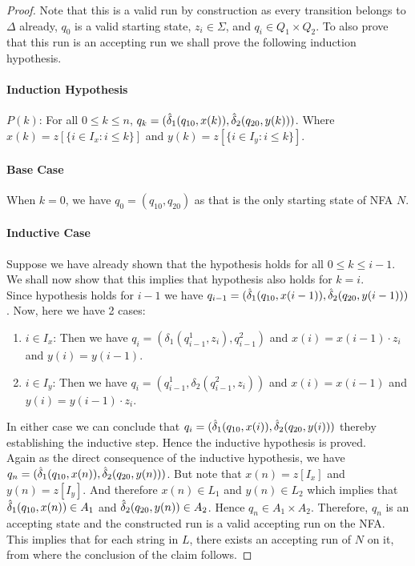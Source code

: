 \begin{soln}
\begin{proof}
Note that this is a valid run by construction as every transition belongs to $\Delta$ already, $q_0$ is a valid starting state, $z_i \in \Sigma$, and $q_i \in Q_1 \times Q_2$. To also prove that this run is an accepting run we shall prove the following induction hypothesis.

\paragraph{Induction Hypothesis}$P(k)$: For all $0 \leq k \leq n$, $q_k = (\hat{\delta}_1 (q_{10}, x(k)), \hat{\delta}_2(q_{20}, y(k)))$. Where $x(k) = z[\{i \in I_x : i \leq k\}]$ and $y(k) = z[\{i \in I_y : i \leq k\}]$.

\paragraph{Base Case} When $k=0$, we have $q_0 = (q_{10}, q_{20})$ as that is the only starting state of NFA $N$.

\paragraph{Inductive Case} Suppose we have already shown that the hypothesis holds for all $0 \leq k \leq i-1$. We shall now show that this implies that hypothesis also holds for $k=i$.\\

Since hypothesis holds for $i-1$ we have $q_{i-1} = (\hat{\delta}_1 (q_{10}, x(i-1)), \hat{\delta}_2(q_{20}, y(i-1)))$. Now, here we have 2 cases:

\begin{enumerate}
    \item $i \in I_x$: Then we have $q_i = (\delta_1(q_{i-1}^1, z_i), q_{i-1}^2)$ and $x(i) = x(i-1) \cdot z_i$ and $y(i) = y(i-1)$.
    
    \item $i \in I_y$: Then we have $q_i = (q_{i-1}^1, \delta_2(q_{i-1}^2, z_i))$ and $x(i) = x(i-1)$ and $y(i) = y(i-1) \cdot z_i$.
\end{enumerate}

In either case we can conclude that $q_i = (\hat{\delta}_1 (q_{10}, x(i)), \hat{\delta}_2(q_{20}, y(i)))$ thereby establishing the inductive step. Hence the inductive hypothesis is proved.\\

Again as the direct consequence of the inductive hypothesis, we have $q_n = (\hat{\delta}_1 (q_{10}, x(n)), \hat{\delta}_2(q_{20}, y(n)))$. But note that $x(n) = z[I_x]$ and $y(n) = z[I_y]$. And therefore $x(n) \in L_1$ and $y(n) \in L_2$ which implies that $\hat{\delta}_1 (q_{10}, x(n)) \in A_1$ and $\hat{\delta}_2(q_{20}, y(n)) \in A_2$. Hence $q_n \in A_1 \times A_2$. Therefore, $q_n$ is an accepting state and the constructed run is a valid accepting run on the NFA. This implies that for each string in $L$, there exists an accepting run of $N$ on it, from where the conclusion of the claim follows.
\end{proof}
\end{soln}

